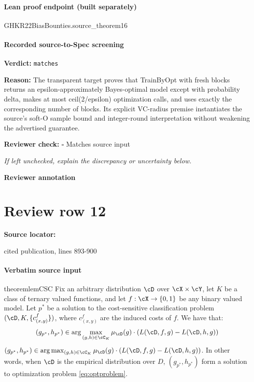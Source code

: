 \documentclass[10pt]{article}
\newcommand{\reviewerbox}{%
  \par\noindent\fbox{\parbox{0.96\linewidth}{\rule{0pt}{0.38in}}}\par
}
\newcommand{\reviewmatch}[1]{%
  \par\noindent\textbf{Reviewer check:} $\square$\; #1\par
  \noindent\emph{If left unchecked, explain the discrepancy or uncertainty below.}\par
}
\begin{document}
\paragraph{Lean proof endpoint (built separately)}\begin{ReviewVerbatim}
GHKR22BiasBounties.source_theorem16
\end{ReviewVerbatim}

\paragraph{Recorded source-to-Spec screening}
\textbf{Verdict:} \texttt{matches}
\\
{\raggedright
\textbf{Reason:} The transparent target proves that TrainByOpt with fresh blocks returns an epsilon-\allowbreak{}approximately Bayes-\allowbreak{}optimal model except with probability delta, makes at most ceil(2/\allowbreak{}epsilon) optimization calls, and uses exactly the corresponding number of blocks.\allowbreak{} Its explicit VC-\allowbreak{}radius premise instantiates the source's soft-\allowbreak{}O sample bound and integer-\allowbreak{}round interpretation without weakening the advertised guarantee.\allowbreak{}
\par}
\reviewmatch{Matches source input}
\noindent\textbf{Reviewer annotation}\par
\reviewerbox
\clearpage
\hypertarget{source-claim-1de02a646e873bbe}{}
\section*{Review row 12}
\textbf{Source locator:} {\footnotesize\raggedright cited publication, lines 893-\allowbreak{}900\par}
\paragraph{Verbatim source input}
\begin{ReviewVerbatim}
\begin{restatable}{theorem}{lemCSC}
\label{lem:CSC}
Fix an arbitrary distribution $\cD$ over $\cX\times \cY$, let $K$ be a class of ternary valued functions, and let $f:\cX\rightarrow \{0,1\}$ be any binary valued model. Let $p^*$ be a solution to the cost-sensitive classification problem $(\cD, K, \{c_{(x,y)}^f\})$, where $c_{(x,y)}^f$ are the induced costs of $f$. We have that:
\ifdraft
$$(g_{p^*},h_{p^*}) \in \arg\max_{(g,h) \in \cC_K }\mu_{\cD}(g)\cdot (L(\cD,f,g) - L(\cD,h,g))$$
\else $(g_{p^*},h_{p^*}) \in \arg\max_{(g,h) \in \cC_K }\mu_{\cD}(g)\cdot (L(\cD,f,g) - L(\cD,h,g))$. \fi
In other words, when $\cD$ is the empirical distribution over $D$, $(g_{p^*},h_{p^*})$ form a solution to optimization problem \eqref{eq:optproblem}.
\end{restatable}
\end{ReviewVerbatim}
\end{document}
